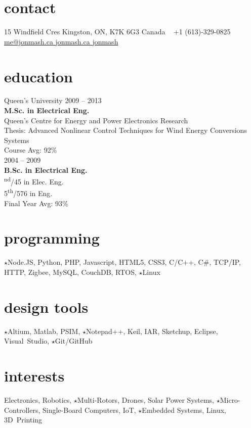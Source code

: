 
\begin{aside}
%
\section{contact}
15 Windfield Cres
Kingston, ON, K7K 6G3
Canada
~
+1 (613)-329-0825
~
\href{mailto:me@jonmash.ca}{me@jonmash.ca \faEnvelope}
\href{http://www.jonmash.ca}{jonmash.ca \faLink}
\href{https://github.com/jonmash}{jonmash \faGithub}
%
\section{education}
\restorecr
{\headingfont Queen's University}
{2009 -- 2013} \\
\textbf{M.Sc. {\normalfont in Electrical Eng.}}\\
{\bodyfontit Queen’s Centre for Energy and Power Electronics Research}\\
Thesis: Advanced Nonlinear Control Techniques for Wind Energy Conversions Systems\\
Course Avg: 92\%\\
\vspace{0.3cm}
{2004 -- 2009} \\
\textbf{B.Sc. {\normalfont in Electrical Eng.}}\\
{\textsuperscript{nd}/45 in Elec. Eng. \\ 5\textsuperscript{th}/576 in Eng.}\\
Final Year Avg: 93\%\\
%
\section{programming}
{\color{orange} $\star$}Node.JS, Python, PHP,
Javascript, HTML5, CSS3, C/C++, C\#,  
TCP/IP, HTTP, Zigbee, 
MySQL, CouchDB, 
RTOS, {\color{orange} $\star$}Linux
%
\section{design tools}
{\color{orange} $\star$}Altium, Matlab, PSIM, {\color{orange} $\star$}Notepad++, Keil, IAR, Sketchup, Eclipse, Visual~Studio, {\color{orange} $\star$}Git/GitHub
%
\section{interests}
Electronics, Robotics, {\color{orange} $\star$}Multi-Rotors, Drones, Solar Power Systems, {\color{orange} $\star$}Micro-Controllers, Single-Board Computers, IoT, {\color{orange} $\star$}Embedded Systems, Linux, 3D~Printing
\obeycr
\end{aside}